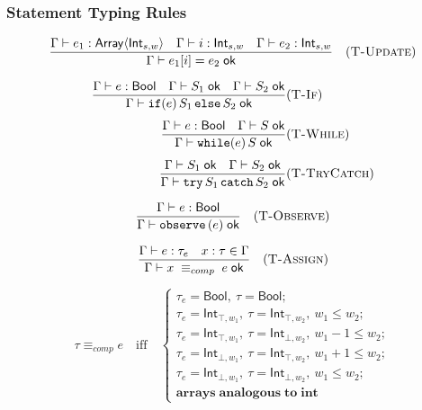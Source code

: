 \subsubsection*{Statement Typing Rules}

\[
  \frac{\Gamma\vdash e_1 : \mathsf{Array}\langle\mathsf{Int}_{s,w}\rangle
  \quad
  \Gamma\vdash i    : \mathsf{Int}_{s,w}
  \quad
  \Gamma\vdash e_2  : \mathsf{Int}_{s,w}}
  {\Gamma\vdash e_1[i] = e_2 \;\mathsf{ok}}
  \quad(\textsc{T-Update})
\]

\begin{multicols}{2}
  \[
    \begin{aligned}
      \frac{\Gamma \vdash e : \mathsf{Bool}
        \quad
        \Gamma \vdash S_1\;\mathsf{ok}
        \quad
        \Gamma \vdash S_2\;\mathsf{ok}}
      {\Gamma \vdash \mathtt{if}(e)\,S_1\,\mathtt{else}\,S_2\;\mathsf{ok}}
       & (\textsc{T-If})       \\[1ex]
      \frac{\Gamma \vdash e : \mathsf{Bool}
        \quad
        \Gamma \vdash S\;\mathsf{ok}}
      {\Gamma \vdash \mathtt{while}(e)\,S\;\mathsf{ok}}
       & (\textsc{T-While})    \\[1ex]
      \frac{\Gamma \vdash S_1\;\mathsf{ok}
        \quad
        \Gamma \vdash S_2\;\mathsf{ok}}
      {\Gamma \vdash \mathtt{try}\,S_1\,\mathtt{catch}\,S_2\;\mathsf{ok}}
       & (\textsc{T-TryCatch})
    \end{aligned}
  \]

  \[
    \frac{\Gamma \vdash e : \mathsf{Bool}}
    {\Gamma \vdash \mathtt{observe}\,(e)\;\mathsf{ok}}
    \quad(\textsc{T-Observe})
  \]

  \[
    \frac{\Gamma \vdash e : \tau_e
      \quad
      x:\tau \in \Gamma}
    {\Gamma \vdash x \;\equiv_{comp}\; e\;\mathsf{ok}}
    \quad(\textsc{T-Assign})
  \]
\end{multicols}


\[
  \tau \equiv_{comp} e\quad\text{iff}\quad
  \begin{cases}
    \tau_e = \mathsf{Bool},\ \tau = \mathsf{Bool};                                       \\[4pt]
    \tau_e = \mathsf{Int}_{\top,w_1},\ \tau = \mathsf{Int}_{\top,w_2},\ w_1 \le w_2;     \\[4pt]
    \tau_e = \mathsf{Int}_{\top,w_1},\ \tau = \mathsf{Int}_{\bot,w_2},\ w_1 - 1 \le w_2; \\[4pt]
    \tau_e = \mathsf{Int}_{\bot,w_1},\ \tau = \mathsf{Int}_{\top,w_2},\ w_1 + 1 \le w_2; \\[4pt]
    \tau_e = \mathsf{Int}_{\bot,w_1},\ \tau = \mathsf{Int}_{\bot,w_2},\ w_1 \le w_2;     \\[4pt]
    \mathbf{arrays\;analogous\;to\;int}
  \end{cases}
\]



